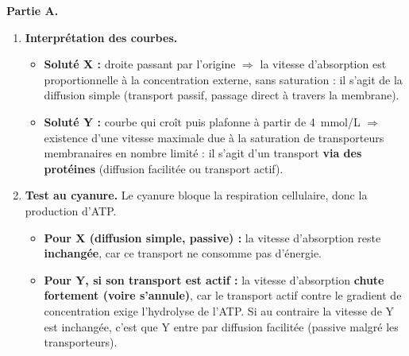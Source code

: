 \documentclass[11pt]{article}
\newcommand{\cle}[1]{{\popxbold\color{popdark}#1}}
\begin{document}
\begin{corrige}
\textbf{Partie A.}
\begin{enumerate}
\item \textbf{Interprétation des courbes.}
\begin{itemize}
\item \textbf{Soluté X :} droite passant par l'origine $\Rightarrow$ la vitesse d'absorption est proportionnelle à la concentration externe, sans saturation : il s'agit de la \cle{diffusion simple} (transport passif, passage direct à travers la membrane).
\item \textbf{Soluté Y :} courbe qui croît puis plafonne à partir de 4~mmol/L $\Rightarrow$ existence d'une vitesse maximale due à la saturation de transporteurs membranaires en nombre limité : il s'agit d'un transport \textbf{via des protéines} (diffusion facilitée ou transport actif).
\end{itemize}
\item \textbf{Test au cyanure.} Le cyanure bloque la respiration cellulaire, donc la production d'ATP.
\begin{itemize}
\item \textbf{Pour X (diffusion simple, passive) :} la vitesse d'absorption reste \textbf{inchangée}, car ce transport ne consomme pas d'énergie.
\item \textbf{Pour Y, si son transport est actif :} la vitesse d'absorption \textbf{chute fortement (voire s'annule)}, car le transport actif contre le gradient de concentration exige l'hydrolyse de l'ATP. Si au contraire la vitesse de Y est inchangée, c'est que Y entre par diffusion facilitée (passive malgré les transporteurs).
\end{itemize}
\end{enumerate}


\end{corrige}
\end{document}
